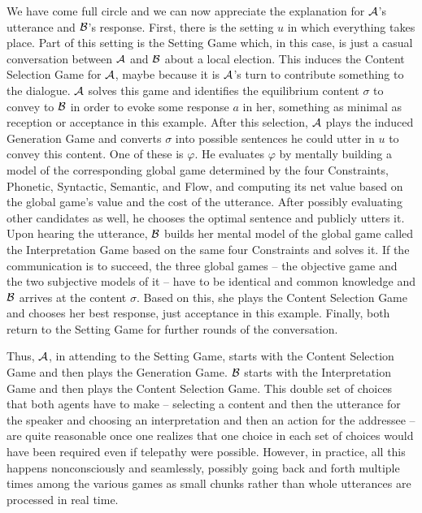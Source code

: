 We have come full circle and we can now appreciate the explanation for $\cal A$'s utterance and $\cal B$'s response. First, there is the setting $u$ in which everything takes place. Part of this setting is the Setting Game which, in this case, is just a casual conversation between $\cal A$ and $\cal B$ about a local election. This induces the Content Selection Game for $\cal A$, maybe because it is $\cal A$'s turn to contribute something to the dialogue. $\cal A$ solves this game and identifies the equilibrium content $\sigma$ to convey to $\cal B$ in order to evoke some response $a$ in her, something as minimal as reception or acceptance in this example. After this selection, $\cal A$ plays the induced Generation Game and converts $\sigma$ into possible sentences he could utter in $u$ to convey this content. One of these is $\varphi$. He evaluates $\varphi$ by mentally building a model of the corresponding global game determined by the four Constraints, Phonetic, Syntactic, Semantic, and Flow, and computing its net value based on the global game's value and the cost of the utterance. After possibly evaluating other candidates as well, he chooses the optimal sentence and publicly utters it. Upon hearing the utterance, $\cal B$ builds her mental model of the global game called the Interpretation Game based on the same four Constraints and solves it. If the communication is to succeed, the three global games -- the objective game and the two subjective models of it -- have to be identical and common knowledge and $\cal B$ arrives at the content $\sigma$. Based on this, she plays the Content Selection Game and chooses her best response, just acceptance in this example. Finally, both return to the Setting Game for further rounds of the conversation.

Thus, $\cal A$, in attending to the Setting Game, starts with the Content Selection Game and then plays the Generation Game. $\cal B$ starts with the Interpretation Game and then plays the Content Selection Game. This double set of choices that both agents have to make -- selecting a content and then the utterance for the speaker and choosing an interpretation and then an action for the addressee -- are quite reasonable once one realizes that one choice in each set of choices would have been required even if telepathy were possible. However, in practice, all this happens nonconsciously and seamlessly, possibly going back and forth multiple times among the various games as small chunks rather than whole utterances are processed in real time.

